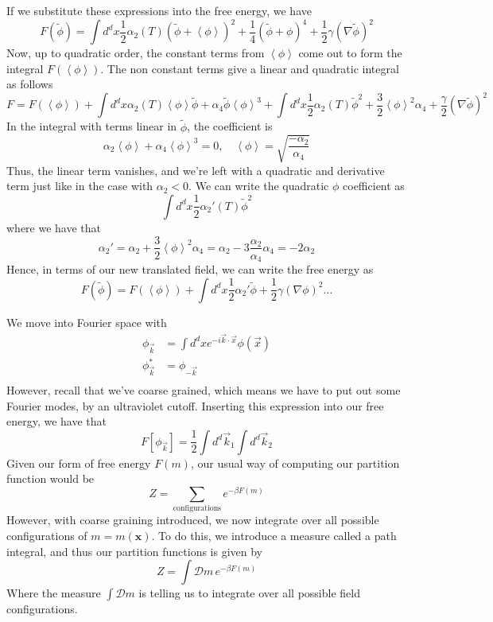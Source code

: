 \documentclass[11pt, oneside]{article}   	%
\begin{document}
If we substitute these expressions into the free energy, we have
\[
	F( \widetilde{\phi}) = \int d^{d }x \frac{1}{ 2} \alpha_2 ( T ) ( \widetilde { \phi} + \left<\phi \right> )^ 2 + \frac{1}{4} ( \widetilde{ \phi} + \phi)^ 4 + \frac{1}{2 } \gamma ( \nabla  \widetilde{\phi} ) ^2 
\] Now, up to quadratic order, the constant terms from $ \left< \phi \right> $ 
come out to form the integral $ F ( \left< \phi \right> ) $. The non constant terms 
give a linear and quadratic integral as follows 
\[
	F = F( \left< \phi \right>) + \int d^{d } x \alpha_2 ( T ) \left< \phi \right>\widetilde{ \phi} + \alpha_4 \widetilde{ \phi } \left< \phi \right>^3 +\int d^{d } x \frac{1}{2} \alpha_2 ( T ) \widetilde { \phi }^2 + \frac{3}{2 } \left< \phi \right>^2 \alpha_4 + \frac{\gamma}{2 } ( \nabla \widetilde{ \phi }  )^2 
\] 
In the integral with terms linear in $ \widetilde{ \phi } $, the coefficient is 
 \[
\alpha_2 \left< \phi \right> + \alpha_4 \left< \phi  \right>^3 = 0, \quad \left< \phi \right> = \sqrt{ \frac{ - \alpha_2 }{\alpha_4}} 
\] Thus, the linear term vanishes, and we're left with a quadratic and derivative term
just like in the case with $ \alpha_2 < 0 $.
We can write the quadratic $ \phi $ coefficient as 
\[
	\int d^{d }x \frac{1}{ 2 } \alpha_2' ( T) \widetilde{ \phi }^2 
\]  where we have that 
\[
\alpha_2'  = \alpha_2 + \frac{3}{2} \left< \phi  \right>^2\alpha_4 = \alpha_2  - 3 \frac{\alpha_2 }{\alpha_4} \alpha_4  = - 2 \alpha_2 
\] 
Hence, in terms of our new translated field, we can write the free energy as 
\[
	F (\widetilde{ \phi } ) = F( \left< \phi \right>) + \int d ^{d }x \frac{1}{ 2} \alpha_2' \widetilde{ \phi } + \frac{1}{2 }\gamma ( \nabla \phi)^2 \dots 
\] 

We move into Fourier space with 
\begin{align*}
	\phi_{\vec{k}}  &= \int d^{d}x e^{ - i \vec{k} \cdot  \vec{x}} \phi( \vec{x}) \\
	\phi_{ \vec{k}}^*  &= \phi_{-\vec{k}}  \\
\end{align*}
However, recall that we've coarse grained, which means 
we have to put out some Fourier modes, by an ultraviolet cutoff. 
Inserting this expression into our free energy, we have that 
\[
	F [ \phi_{ \vec{k}} ] = \frac{1}{2}\int d^{d} \vec{k}_1 \int d^{ d}\vec{k}_2 
\] 
Given our form of free energy $F(m)$, our usual way of computing our partition function would be \[ Z = \sum_{\text{configurations}} e^{ - \beta F(m) } \] However, with coarse graining introduced, we now integrate over all possible configurations of $m = m(\mathbf{ x} )$. To do this, we introduce a measure called a path integral, and thus our partition functions is given by \[ Z = \int \mathcal{D} m \, e^{ - \beta F(m)} \]
Where the measure $\int \mathcal{ D } m $ is telling us to integrate over all possible field configurations. 
\end{document}
